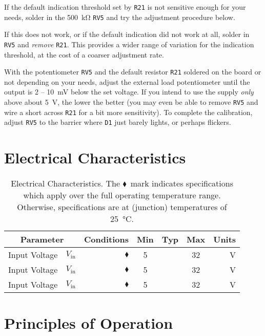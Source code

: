 \documentclass[letterpaper,twocolumn,11pt]{article}
\newcommand{\refdes}[1]{\texttt{#1}}
\newcommand{\wtemp}{\ensuremath{\blacklozenge}}
\begin{document}
If the default indication threshold set by \refdes{R21} is not sensitive enough
for your needs, solder in the \SI{500}{\kohm} \refdes{RV5} and try the
adjustment procedure below.

If this does not work, or if the default indication did not work at all, solder
in \refdes{RV5} and \emph{remove} \refdes{R21}. This provides a wider range of
variation for the indication threshold, at the cost of a coarser adjustment
rate.

With the potentiometer \refdes{RV5} and the default resistor \refdes{R21}
soldered on the board or not depending on your needs, adjust the external load
potentiometer until the output is 2 -- \SI{10}{\mV} below the set voltage. If
you intend to use the supply \emph{only} above about \SI{5}{\V}, the lower the
better (you may even be able to remove \refdes{RV5} and wire a short across
\refdes{R21} for a bit more sensitivity). To complete the calibration, adjust
\refdes{RV5} to the barrier where \refdes{D1} just barely lights, or perhaps
flickers.

\section{Electrical Characteristics}\label{sec:chars}

\begin{table*}[ht]
  \centering
  \caption{Electrical Characteristics. The \wtemp\ mark indicates specifications
  which apply over the full operating temperature range. Otherwise,
specifications are at (junction) temperatures of \SI{25}{\celsius}.}
  \begin{tabular}{lr|lr|cccr}
    \toprule
    \multicolumn{2}{c}{\textbf{Parameter}} &
    \multicolumn{2}{c}{\textbf{Conditions}} & \textbf{Min} & \textbf{Typ} &
    \textbf{Max} & \multicolumn{1}{c}{\textbf{Units}} \\
    \midrule
    Input Voltage & $V_\text{in}$ & & \wtemp & 5 & & 32 & \si{\V} \\
    Input Voltage & $V_\text{in}$ & & \wtemp & 5 & & 32 & \si{\V} \\
    Input Voltage & $V_\text{in}$ & & \wtemp & 5 & & 32 & \si{\V} \\
    \bottomrule
  \end{tabular}
  \label{tab:chars}
\end{table*}

\section{Principles of Operation}
\end{document}
